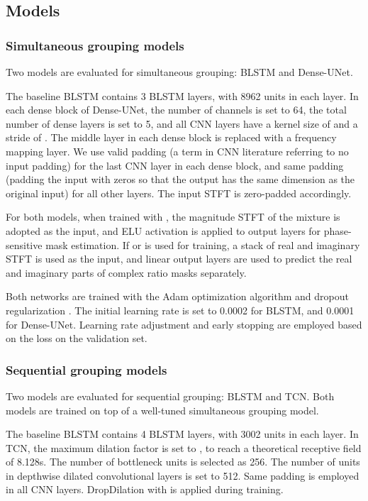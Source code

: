 \documentclass[journal]{IEEEtran}
\begin{document}
\subsection{Models}
\label{sec:5.2}
\subsubsection{Simultaneous grouping models}
\label{sec:5.2.1}
Two models are evaluated for simultaneous grouping: BLSTM and Dense-UNet.

The baseline BLSTM contains 3 BLSTM layers, with 8962 units in each layer. 
In each dense block of Dense-UNet, the number of channels  is set to 64, the total number of dense layers  is set to 5, and all CNN layers have a kernel size of  and a stride of .
The middle layer in each dense block is replaced with a frequency mapping layer. 
We use valid padding (a term in CNN literature referring to no input padding) for the last CNN layer in each dense block, and same padding (padding the input with zeros so that the output has the same dimension as the original input) for all other layers.
The input STFT is zero-padded accordingly.

For both models, when trained with , the magnitude STFT of the mixture is adopted as the input, and ELU activation is applied to output layers for phase-sensitive mask estimation.
If  or  is used for training, a stack of real and imaginary STFT is used as the input, and linear output layers are used to predict the real and imaginary parts of complex ratio masks separately.

Both networks are trained with the Adam optimization algorithm \cite{Adam} and dropout regularization \cite{Dropout}.
The initial learning rate is set to 0.0002 for BLSTM, and 0.0001 for Dense-UNet.
Learning rate adjustment and early stopping are employed based on the loss on the validation set. 


\subsubsection{Sequential grouping models}
\label{sec:5.2.2}
Two models are evaluated for sequential grouping: BLSTM and TCN.
Both models are trained on top of a well-tuned simultaneous grouping model.

The baseline BLSTM contains 4 BLSTM layers, with 3002 units in each layer. 
In TCN, the maximum dilation factor is set to , to reach a theoretical receptive field of 8.128s.
The number of bottleneck units  is selected as 256. 
The number of units in depthwise dilated convolutional layers  is set to 512.
Same padding is employed in all CNN layers.
DropDilation with  is applied during training.
\end{document}
